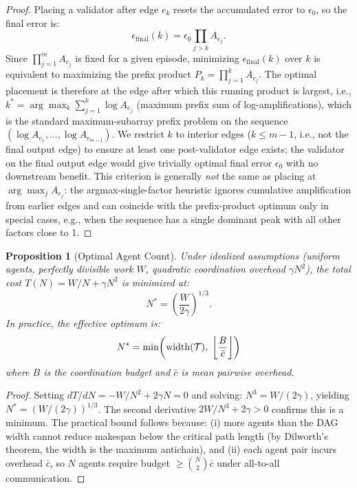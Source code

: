 \documentclass[10pt, twocolumn]{article}
\newtheorem{proposition}{Proposition}
\begin{document}
\begin{proof}
Placing a validator after edge $e_k$ resets the accumulated error to $\epsilon_0$, so the final error is:
\[
\epsilon_{\mathrm{final}}(k) = \epsilon_0 \prod_{j > k} A_{e_j}.
\]
Since $\prod_{j=1}^m A_{e_j}$ is fixed for a given episode, minimizing $\epsilon_{\mathrm{final}}(k)$ over $k$ is equivalent to maximizing the prefix product $P_k = \prod_{j=1}^{k} A_{e_j}$. The optimal placement is therefore at the edge after which this running product is largest, i.e., $k^* = \arg\max_k \sum_{j=1}^{k} \log A_{e_j}$ (maximum prefix sum of log-amplifications), which is the standard maximum-subarray prefix problem on the sequence $(\log A_{e_1}, \ldots, \log A_{e_{m-1}})$. We restrict $k$ to interior edges ($k \leq m-1$, i.e., not the final output edge) to ensure at least one post-validator edge exists; the validator on the final output edge would give trivially optimal final error $\epsilon_0$ with no downstream benefit. This criterion is generally \emph{not} the same as placing at $\arg\max_j A_{e_j}$: the argmax-single-factor heuristic ignores cumulative amplification from earlier edges and can coincide with the prefix-product optimum only in special cases, e.g., when the sequence has a single dominant peak with all other factors close to 1.
\end{proof}

\begin{proposition}[Optimal Agent Count]
\label{prop:nstar}
Under idealized assumptions (uniform agents, perfectly divisible work $W$, quadratic coordination overhead $\gamma N^2$), the total cost $T(N) = W/N + \gamma N^2$ is minimized at:
\begin{equation}
    N^* = \left(\frac{W}{2\gamma}\right)^{1/3}.
\end{equation}
In practice, the effective optimum is:
\begin{equation}
    N^* = \min\!\left(\textup{width}(\mathcal{T}),\; \left\lfloor \frac{B}{\bar{c}} \right\rfloor\right)
\end{equation}
where $B$ is the coordination budget and $\bar{c}$ is mean pairwise overhead.
\end{proposition}

\begin{proof}
Setting $dT/dN = -W/N^2 + 2\gamma N = 0$ and solving: $N^3 = W/(2\gamma)$, yielding $N^* = (W/(2\gamma))^{1/3}$. The second derivative $2W/N^3 + 2\gamma > 0$ confirms this is a minimum. The practical bound follows because: (i) more agents than the DAG width cannot reduce makespan below the critical path length (by Dilworth's theorem, the width is the maximum antichain), and (ii) each agent pair incurs overhead $\bar{c}$, so $N$ agents require budget $\geq \binom{N}{2}\bar{c}$ under all-to-all communication.
\end{proof}
\end{document}
